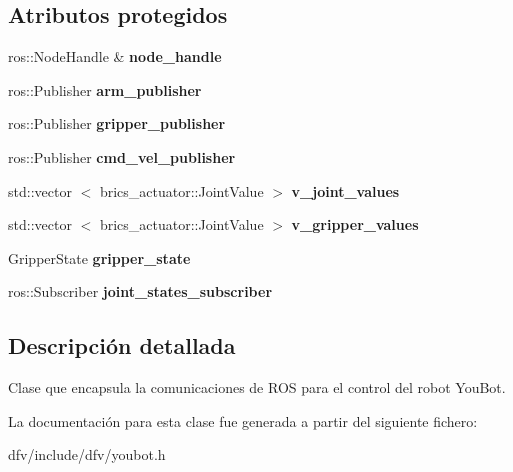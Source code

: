\subsection*{\-Atributos protegidos}
\begin{DoxyCompactItemize}
\item 
\hypertarget{classdfv_1_1Youbot_ac933160ab53585f288cc799b52f69a68}{ros\-::\-Node\-Handle \& {\bfseries node\-\_\-handle}}\label{classdfv_1_1Youbot_ac933160ab53585f288cc799b52f69a68}

\item 
\hypertarget{classdfv_1_1Youbot_a3e7e06d117f2f78eb27cffdb62bc7693}{ros\-::\-Publisher {\bfseries arm\-\_\-publisher}}\label{classdfv_1_1Youbot_a3e7e06d117f2f78eb27cffdb62bc7693}

\item 
\hypertarget{classdfv_1_1Youbot_a33b95ba16f704b706f691b87ed954425}{ros\-::\-Publisher {\bfseries gripper\-\_\-publisher}}\label{classdfv_1_1Youbot_a33b95ba16f704b706f691b87ed954425}

\item 
\hypertarget{classdfv_1_1Youbot_a02be5b55094854fc9113bdf722ebf53f}{ros\-::\-Publisher {\bfseries cmd\-\_\-vel\-\_\-publisher}}\label{classdfv_1_1Youbot_a02be5b55094854fc9113bdf722ebf53f}

\item 
\hypertarget{classdfv_1_1Youbot_a6bb0b4af437162dc72b5d266c316ad5a}{std\-::vector\*
$<$ brics\-\_\-actuator\-::\-Joint\-Value $>$ {\bfseries v\-\_\-joint\-\_\-values}}\label{classdfv_1_1Youbot_a6bb0b4af437162dc72b5d266c316ad5a}

\item 
\hypertarget{classdfv_1_1Youbot_a278c101488612b9e4b2f3ed4dc6d6d47}{std\-::vector\*
$<$ brics\-\_\-actuator\-::\-Joint\-Value $>$ {\bfseries v\-\_\-gripper\-\_\-values}}\label{classdfv_1_1Youbot_a278c101488612b9e4b2f3ed4dc6d6d47}

\item 
\hypertarget{classdfv_1_1Youbot_aeffb78d0de972814aeab8e7ff7841f53}{\-Gripper\-State {\bfseries gripper\-\_\-state}}\label{classdfv_1_1Youbot_aeffb78d0de972814aeab8e7ff7841f53}

\item 
\hypertarget{classdfv_1_1Youbot_ae48d141f16468e936180d6de7fee2ec0}{ros\-::\-Subscriber {\bfseries joint\-\_\-states\-\_\-subscriber}}\label{classdfv_1_1Youbot_ae48d141f16468e936180d6de7fee2ec0}

\end{DoxyCompactItemize}


\subsection{\-Descripción detallada}
\-Clase que encapsula la comunicaciones de \-R\-O\-S para el control del robot \-You\-Bot. 

\-La documentación para esta clase fue generada a partir del siguiente fichero\-:\begin{DoxyCompactItemize}
\item 
dfv/include/dfv/youbot.\-h\end{DoxyCompactItemize}
